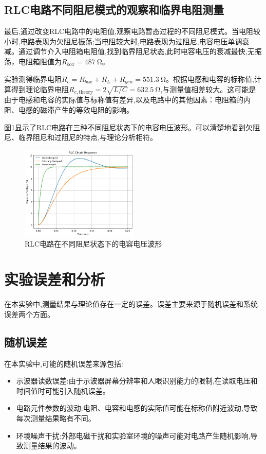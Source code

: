 \documentclass[UTF8]{ctexart}
\begin{document}
\subsection{RLC电路不同阻尼模式的观察和临界电阻测量}

最后,通过改变RLC电路中的电阻值,观察电路暂态过程的不同阻尼模式。当电阻较小时,电路表现为欠阻尼振荡;当电阻较大时,电路表现为过阻尼,电容电压单调衰减。通过调节介入电阻箱电阻值,找到临界阻尼状态,此时电容电压的衰减最快,无振荡，电阻箱阻值为$R_{box}=\SI{487}{\ohm}$。

实验测得临界电阻$R_c =R_{box} +R_{L}+R_{gen}= \SI{551.3}{\ohm}$。根据电感和电容的标称值,计算得到理论临界电阻$R_{c,\text{theory}} = 2\sqrt{L/C} = \SI{632.5}{\ohm}$,与测量值相差较大。这可能是由于电感和电容的实际值与标称值有差异,以及电路中的其他因素：电阻箱的内阻、电感的磁滞产生的等效电阻的影响。

图\ref{fig:rlc_damping}显示了RLC电路在三种不同阻尼状态下的电容电压波形。可以清楚地看到欠阻尼、临界阻尼和过阻尼的特点,与理论分析相符。

\begin{figure}[htbp]
    \centering
    \includegraphics[width=0.5\textwidth]{rlc_damping.png}
    \caption{RLC电路在不同阻尼状态下的电容电压波形}
    \label{fig:rlc_damping}
\end{figure}


\section{实验误差和分析}

在本实验中,测量结果与理论值存在一定的误差。误差主要来源于随机误差和系统误差两个方面。

\subsection{随机误差}

在本实验中,可能的随机误差来源包括:

\begin{itemize}
    \item 示波器读数误差:由于示波器屏幕分辨率和人眼识别能力的限制,在读取电压和时间值时可能引入随机误差。
    \item 电路元件参数的波动:电阻、电容和电感的实际值可能在标称值附近波动,导致每次测量结果略有不同。
    \item 环境噪声干扰:外部电磁干扰和实验室环境的噪声可能对电路产生随机影响,导致测量结果的波动。
\end{itemize}
\end{document}
